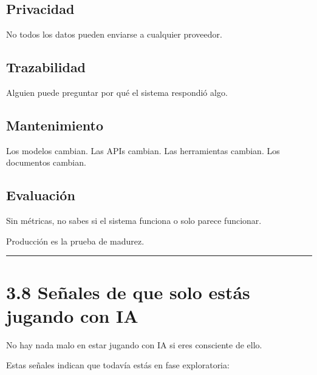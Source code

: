 \subsection{Privacidad}\label{privacidad}

No todos los datos pueden enviarse a cualquier proveedor.

\subsection{Trazabilidad}\label{trazabilidad}

Alguien puede preguntar por qué el sistema respondió algo.

\subsection{Mantenimiento}\label{mantenimiento}

Los modelos cambian. Las APIs cambian. Las herramientas cambian. Los
documentos cambian.

\subsection{Evaluación}\label{evaluaciuxf3n}

Sin métricas, no sabes si el sistema funciona o solo parece funcionar.

Producción es la prueba de madurez.

\begin{center}\rule{0.5\linewidth}{0.5pt}\end{center}

\section{3.8 Señales de que solo estás jugando con
IA}\label{seuxf1ales-de-que-solo-estuxe1s-jugando-con-ia}

No hay nada malo en estar jugando con IA si eres consciente de ello.

Estas señales indican que todavía estás en fase exploratoria:

